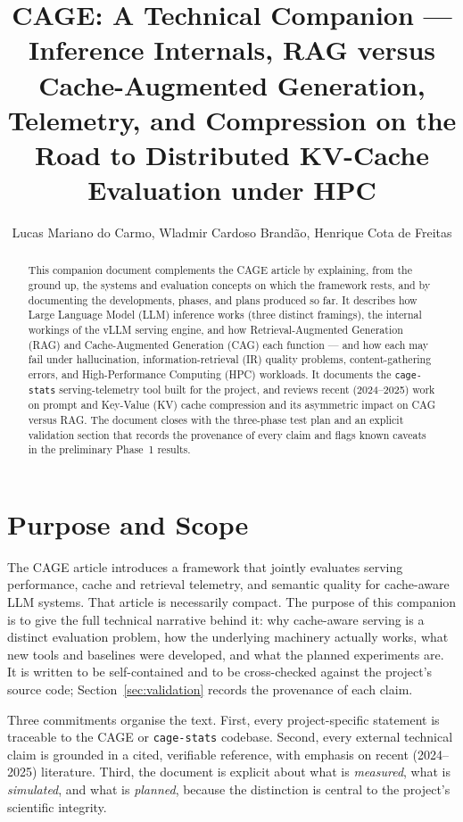 \documentclass[12pt,a4paper]{article}
\title{CAGE: A Technical Companion --- Inference Internals, RAG versus Cache-Augmented Generation, Telemetry, and Compression on the Road to Distributed KV-Cache Evaluation under HPC}
\author{Lucas Mariano do Carmo\inst{1}, Wladmir Cardoso Brandão\inst{1}, Henrique Cota de Freitas\inst{1}}
\date{}
\begin{document}
\singlespacing
\maketitle

\begin{abstract}
This companion document complements the CAGE article by explaining, from the
ground up, the systems and evaluation concepts on which the framework rests, and
by documenting the developments, phases, and plans produced so far. It describes
how Large Language Model (LLM) inference works (three distinct framings), the
internal workings of the vLLM serving engine, and how Retrieval-Augmented
Generation (RAG) and Cache-Augmented Generation (CAG) each function --- and how
each may fail under hallucination, information-retrieval (IR) quality problems,
content-gathering errors, and High-Performance Computing (HPC) workloads. It
documents the \texttt{cage-stats} serving-telemetry tool built for the project,
and reviews recent (2024--2025) work on prompt and Key-Value (KV) cache
compression and its asymmetric impact on CAG versus RAG. The document closes with
the three-phase test plan and an explicit validation section that records the
provenance of every claim and flags known caveats in the preliminary Phase~1
results.
\end{abstract}

\section{Purpose and Scope}

The CAGE article introduces a framework that jointly evaluates serving
performance, cache and retrieval telemetry, and semantic quality for cache-aware
LLM systems. That article is necessarily compact. The purpose of this companion is
to give the full technical narrative behind it: why cache-aware serving is a
distinct evaluation problem, how the underlying machinery actually works, what new
tools and baselines were developed, and what the planned experiments are. It is
written to be self-contained and to be cross-checked against the project's source
code; Section~\ref{sec:validation} records the provenance of each claim.

Three commitments organise the text. First, every project-specific statement is
traceable to the CAGE or \texttt{cage-stats} codebase. Second, every external
technical claim is grounded in a cited, verifiable reference, with emphasis on
recent (2024--2025) literature. Third, the document is explicit about what is
\emph{measured}, what is \emph{simulated}, and what is \emph{planned}, because the
distinction is central to the project's scientific integrity.
\end{document}
